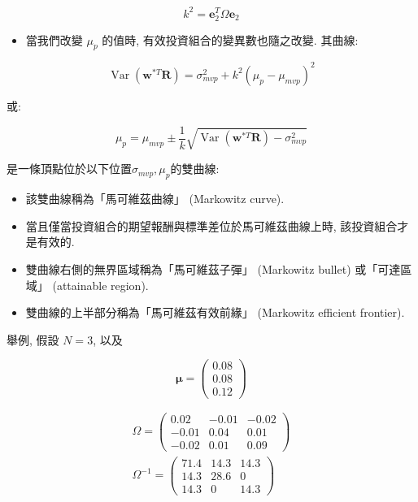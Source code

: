 \documentclass[letterpaper]{article}
\begin{document}
		$$
		k^{2}=\mathbf{e}_{2}^{T} \Omega \mathbf{e}_{2}
		$$
		
		\begin{itemize}
			\item 當我們改變 $\mu_{p}$ 的值時, 有效投資組合的變異數也隨之改變. 其曲線: 
		\end{itemize}
		
		$$
		\operatorname{Var}\left (\mathbf{w}^{* T} \mathbf{R}\right) =\sigma_{m v p}^{2}+k^{2}\left (\mu_{p}-\mu_{m v p}\right) ^{2}
		$$
		
		或: 
		
		$$
		\mu_{p}=\mu_{m v p} \pm \frac{1}{k} \sqrt{\operatorname{Var}\left (\mathbf{w}^{* T} \mathbf{R}\right) -\sigma_{m v p}^{2}}
		$$
		
		是一條頂點位於以下位置$\sigma_{m v p}, \mu_{p}$的雙曲線: 
		
		\begin{itemize}
			\item 該雙曲線稱為「馬可維茲曲線」 (Markowitz curve). 
			\item 當且僅當投資組合的期望報酬與標準差位於馬可維茲曲線上時, 該投資組合才是有效的. 
			\item 雙曲線右側的無界區域稱為「馬可維茲子彈」 (Markowitz bullet) 或「可達區域」 (attainable region). 
			\item 雙曲線的上半部分稱為「馬可維茲有效前緣」 (Markowitz efficient frontier). 
			
		\end{itemize}
		
		舉例, 假設 $N=3$, 以及
		
		$$
		\boldsymbol{\mu}=\left (\begin{array}{l}
			0.08 \\
			0.08 \\
			0.12
		\end{array}\right) 
		$$
		
		$$
		\begin{gathered}
			\Omega=\left (\begin{array}{ccc}
				0.02 & -0.01 & -0.02 \\
				-0.01 & 0.04 & 0.01 \\
				-0.02 & 0.01 & 0.09
			\end{array}\right) \\
			\Omega^{-1}=\left (\begin{array}{ccc}
				71.4 & 14.3 & 14.3 \\
				14.3 & 28.6 & 0 \\
				14.3 & 0 & 14.3
			\end{array}\right) 
		\end{gathered}
		$$
		
\end{document}
